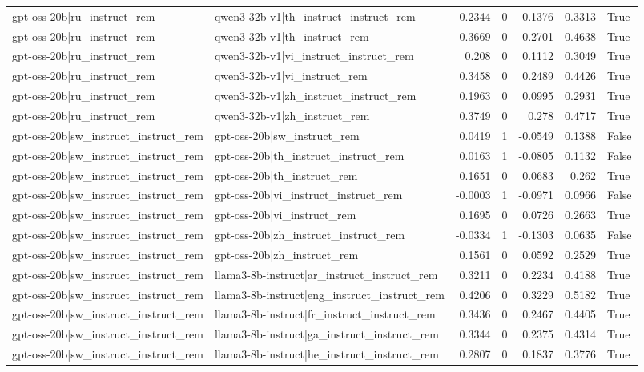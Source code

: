 \begin{table}
\begin{tabular}{l l r r r r l}
gpt-oss-20b|ru_instruct_rem & qwen3-32b-v1|th_instruct_instruct_rem & 0.2344 & 0 & 0.1376 & 0.3313 & True \\
gpt-oss-20b|ru_instruct_rem & qwen3-32b-v1|th_instruct_rem & 0.3669 & 0 & 0.2701 & 0.4638 & True \\
gpt-oss-20b|ru_instruct_rem & qwen3-32b-v1|vi_instruct_instruct_rem & 0.208 & 0 & 0.1112 & 0.3049 & True \\
gpt-oss-20b|ru_instruct_rem & qwen3-32b-v1|vi_instruct_rem & 0.3458 & 0 & 0.2489 & 0.4426 & True \\
gpt-oss-20b|ru_instruct_rem & qwen3-32b-v1|zh_instruct_instruct_rem & 0.1963 & 0 & 0.0995 & 0.2931 & True \\
gpt-oss-20b|ru_instruct_rem & qwen3-32b-v1|zh_instruct_rem & 0.3749 & 0 & 0.278 & 0.4717 & True \\
gpt-oss-20b|sw_instruct_instruct_rem & gpt-oss-20b|sw_instruct_rem & 0.0419 & 1 & -0.0549 & 0.1388 & False \\
gpt-oss-20b|sw_instruct_instruct_rem & gpt-oss-20b|th_instruct_instruct_rem & 0.0163 & 1 & -0.0805 & 0.1132 & False \\
gpt-oss-20b|sw_instruct_instruct_rem & gpt-oss-20b|th_instruct_rem & 0.1651 & 0 & 0.0683 & 0.262 & True \\
gpt-oss-20b|sw_instruct_instruct_rem & gpt-oss-20b|vi_instruct_instruct_rem & -0.0003 & 1 & -0.0971 & 0.0966 & False \\
gpt-oss-20b|sw_instruct_instruct_rem & gpt-oss-20b|vi_instruct_rem & 0.1695 & 0 & 0.0726 & 0.2663 & True \\
gpt-oss-20b|sw_instruct_instruct_rem & gpt-oss-20b|zh_instruct_instruct_rem & -0.0334 & 1 & -0.1303 & 0.0635 & False \\
gpt-oss-20b|sw_instruct_instruct_rem & gpt-oss-20b|zh_instruct_rem & 0.1561 & 0 & 0.0592 & 0.2529 & True \\
gpt-oss-20b|sw_instruct_instruct_rem & llama3-8b-instruct|ar_instruct_instruct_rem & 0.3211 & 0 & 0.2234 & 0.4188 & True \\
gpt-oss-20b|sw_instruct_instruct_rem & llama3-8b-instruct|eng_instruct_instruct_rem & 0.4206 & 0 & 0.3229 & 0.5182 & True \\
gpt-oss-20b|sw_instruct_instruct_rem & llama3-8b-instruct|fr_instruct_instruct_rem & 0.3436 & 0 & 0.2467 & 0.4405 & True \\
gpt-oss-20b|sw_instruct_instruct_rem & llama3-8b-instruct|ga_instruct_instruct_rem & 0.3344 & 0 & 0.2375 & 0.4314 & True \\
gpt-oss-20b|sw_instruct_instruct_rem & llama3-8b-instruct|he_instruct_instruct_rem & 0.2807 & 0 & 0.1837 & 0.3776 & True \\

\end{tabular}
\end{table}
